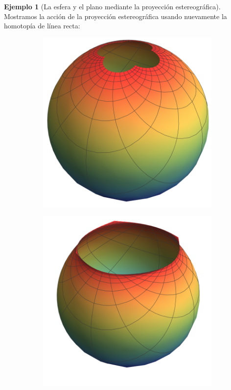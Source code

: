 \documentclass[spanish]{book}
\theoremstyle{definition}
\newtheorem*{ejem}{Ejemplo}
\begin{document}
\begin{ejem}[La esfera y el plano mediante la proyección estereográfica]
	Mostramos la acción de la proyección estereográfica usando nuevamente la homotopía de línea recta:
	\vspace{.5cm}
	\begin{figure}[H]
		\begin{subfigure}{0.32\textwidth}
			\centering
			\includegraphics[width=\linewidth]{sup22}
		\end{subfigure}
		\begin{subfigure}{.32\textwidth}
			\centering
			\includegraphics[width=\linewidth]{sup23}

\end{subfigure}
\end{figure}
\end{ejem}
\end{document}
